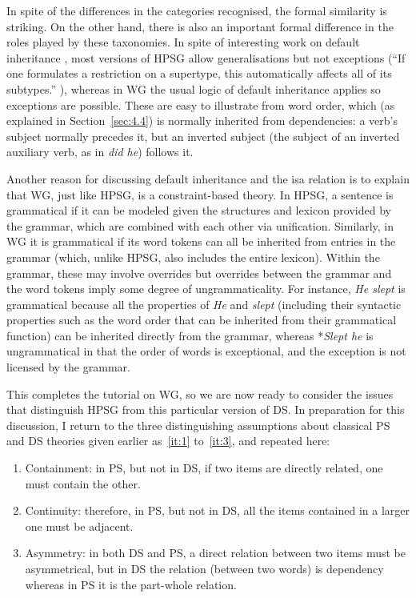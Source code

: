 \documentclass[output=paper]{langscibook}
\begin{document}
In spite of the differences in the categories recognised, the formal similarity is striking. On the other hand, there is also an important formal difference in the roles played by these taxonomies. In spite of interesting work on default inheritance \citep{LC99a}, most versions of HPSG allow generalisations but not exceptions (``If one formulates a restriction on a supertype, this automatically affects all of its subtypes.'' \citep[275]{MuellerGT-Eng2}), whereas in WG the usual logic of default inheritance applies so exceptions are possible. These are easy to illustrate from word order, which (as explained in Section~\ref{sec:4.4}) is normally inherited from dependencies: a verb’s subject normally precedes it, but an inverted subject (the subject of an inverted auxiliary verb, as in \emph{did he}) follows it.

Another reason for discussing default inheritance and the isa relation is to explain that WG, just like HPSG, is a constraint-based theory. In HPSG, a sentence is grammatical if it can be modeled given the structures and lexicon provided by the grammar, which are combined with each other via unification. Similarly, in WG it is grammatical if its word tokens can all be inherited from entries in the grammar (which, unlike HPSG, also includes the entire lexicon). Within the grammar, these may involve overrides but overrides between the grammar and the word tokens imply some degree of ungrammaticality. For instance, \emph{He slept} is grammatical because all the properties of \emph{He} and \emph{slept} (including their syntactic properties such as the word order that can be inherited from their grammatical function) can be inherited directly from the grammar, whereas *\emph{Slept he} is ungrammatical in that the order of words is exceptional, and the exception is not licensed by the grammar.

This completes the tutorial on WG, so we are now ready to consider the issues that distinguish HPSG from this particular version of DS. In preparation for this discussion, I return to the three distinguishing assumptions about classical PS and DS theories given earlier as~\ref{it:1} to~\ref{it:3}, and repeated here:

\begin{enumerate}
	\item Containment: in PS, but not in DS, if two items are directly related, one must contain the other.
	
	\item Continuity: therefore, in PS, but not in DS, all the items contained in a larger one must be adjacent.
	
	\item Asymmetry: in both DS and PS, a direct relation between two items must be asymmetrical, but in DS the relation (between two words) is dependency whereas in PS it is the part-whole relation.
\end{enumerate}
\end{document}

